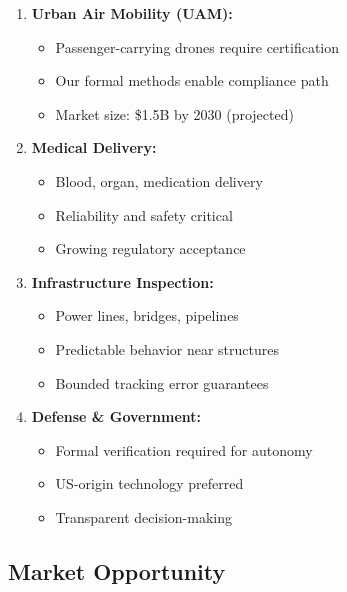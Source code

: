 \begin{enumerate}
    \item \textbf{Urban Air Mobility (UAM):}
    \begin{itemize}
        \item Passenger-carrying drones require certification
        \item Our formal methods enable compliance path
        \item Market size: \$1.5B by 2030 (projected)
    \end{itemize}

    \item \textbf{Medical Delivery:}
    \begin{itemize}
        \item Blood, organ, medication delivery
        \item Reliability and safety critical
        \item Growing regulatory acceptance
    \end{itemize}

    \item \textbf{Infrastructure Inspection:}
    \begin{itemize}
        \item Power lines, bridges, pipelines
        \item Predictable behavior near structures
        \item Bounded tracking error guarantees
    \end{itemize}

    \item \textbf{Defense \& Government:}
    \begin{itemize}
        \item Formal verification required for autonomy
        \item US-origin technology preferred
        \item Transparent decision-making
    \end{itemize}
\end{enumerate}

\subsection{Market Opportunity}

